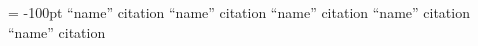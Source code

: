\documentclass[11pt, twocolumn]{article}
\begin{document}
\begin{flushleft}
\begin{thebibliography}{99}
\topmargin = -100pt
    ``name''
        citation
    ``name''
        citation
    ``name''
        citation
    ``name''
        citation
    ``name''
        citation
\end{thebibliography}
\end{flushleft}
\end{document}
